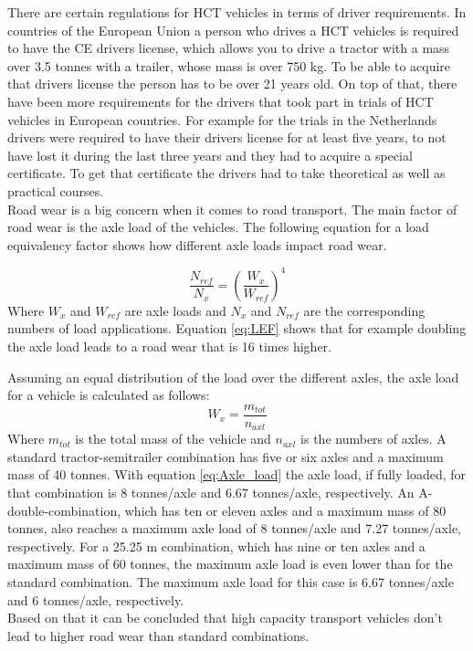 \documentclass[ExampleMasters.tex]{subfiles}
\begin{document}
There are certain regulations for HCT vehicles in terms of driver requirements. In countries of the European Union a person who drives a HCT vehicles is required to have the CE drivers license, which allows you to drive a tractor with a  mass over 3.5 tonnes with a trailer, whose mass is over 750 kg. To be able to acquire that drivers license the person has to be over 21 years old. \cite{EU_driving_licenses} 
On top of that, there have been more requirements for the drivers that took part in trials of HCT vehicles in European countries. For example for the trials in the Netherlands drivers were required to have their drivers license for at least five years, to not have lost it during the last three years and they had to acquire a special certificate. To get that certificate the drivers had to take theoretical as well as practical courses.
\cite{HCT_vehicles_test_netherlands} \\

Road wear is a big concern when it comes to road transport. The main factor of road wear is the axle load of the vehicles. The following equation for a load equivalency factor shows how different axle loads impact road wear.   

\begin{equation}
\frac{N_{ref}}{N_x}=\left(\frac{W_x}{W_{ref}}\right)^4
\label{eq:LEF}
\end{equation}
Where $W_x$ and $W_{ref}$ are axle loads and $N_x$ and $N_{ref}$ are the corresponding numbers of load applications.\cite{road_wear} Equation \eqref{eq:LEF} shows that for example doubling the axle load leads to a road wear that is 16 times higher.

Assuming an equal distribution of the load over the different axles, the axle load for a vehicle is calculated as follows:\\
\begin{equation}
W_x=\frac{m_{tot}}{n_{axl}}
\label{eq:Axle_load}
\end{equation}
Where $m_{tot}$ is the total mass of the vehicle and $n_{axl}$ is the numbers of axles.
A standard tractor-semitrailer combination has five or six axles and a maximum mass of 40 tonnes.
With equation \eqref{eq:Axle_load} the axle load, if fully loaded, for that combination is 8 tonnes/axle and 6.67 tonnes/axle, respectively.
An A-double-combination, which has ten or eleven axles and a maximum mass of 80 tonnes, also reaches a maximum axle  load of 8 tonnes/axle and 7.27 tonnes/axle, respectively.
For a 25.25 m combination, which has nine or ten axles and a maximum mass of 60 tonnes, the maximum axle load is even lower than for the standard combination. The maximum axle load for this case is 6.67 tonnes/axle and 6 tonnes/axle, respectively.
\\Based on that it can be concluded that high capacity transport vehicles don't lead to higher road wear than standard combinations.
\end{document}
